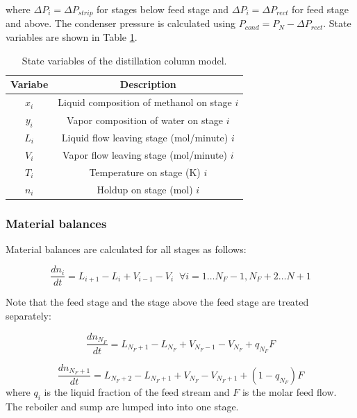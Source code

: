 where $\Delta P_i =\Delta P_{strip}$ for stages below feed stage and $\Delta P_i =\Delta P_{rect}$ for feed stage and above. The condenser pressure is calculated using $P_{cond}=P_{N} - \Delta P_{rect}$. State variables  are shown in Table \ref{tab:state_variables}.
\begin{table}
    \centering
    \caption{State variables of the distillation column model.}
    \begin{tabular}{cc}
        \textbf{Variabe} & \textbf{Description}  \\
        \hline
         $x_i$ &  Liquid composition of methanol on stage $i$ \\
         $y_i$ & Vapor composition of water on stage $i$\\
         $L_i$ & Liquid flow leaving stage (mol/minute) $i$  \\
         $V_i$  & Vapor flow leaving stage (mol/minute) $i$ \\
         $T_i$  & Temperature on stage (K) $i$ \\
         $n_i$  & Holdup on stage (mol) $i$ \\
         \hline
    \end{tabular}
    \label{tab:state_variables}
\end{table}

\subsubsection{Material balances}
Material balances are calculated for all stages as follows:

\begin{equation}
\frac{dn_i}{dt} = L_{i+1}-L_i + V_{i-1}-V_i \;\; \forall i=1 \dots N_F-1, N_F+2 \dots N+1
\end{equation}

\noindent Note that the feed stage and the stage above the feed stage are treated separately:

\begin{equation}
    \frac{dn_{N_F}}{dt} = L_{N_F+1}-L_{N_F} + V_{N_F-1}-V_{N_F} + q_{N_F}F   
\end{equation}

\begin{equation}
   \frac{dn_{N_F+1}}{dt} = L_{N_F+2}-L_{N_F+1} + V_{N_F}-V_{N_F+1} + (1-q_{N_F})F 
\end{equation}
where $q_i$ is the liquid fraction of the feed stream and $F$ is the molar feed flow. The reboiler and sump are lumped into into one stage. 

